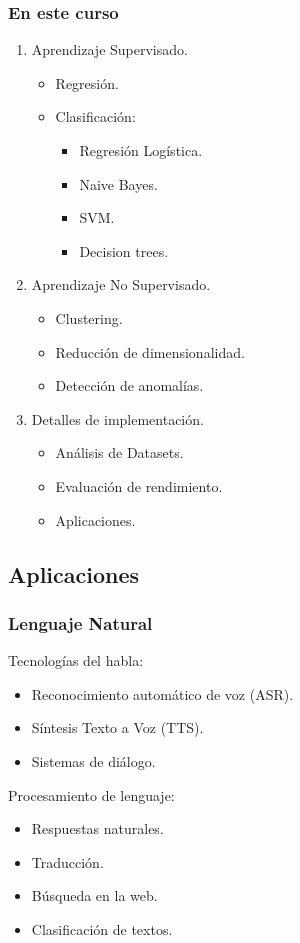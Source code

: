 \documentclass[10pt]{beamer}
\begin{document}
\begin{frame}
    \frametitle{En este curso}
    \begin{enumerate}
        \item Aprendizaje Supervisado.
            \begin{itemize}
                \item Regresión.
                \item Clasificación:
                    \begin{itemize}
                        \item Regresión Logística.
                        \item Naive Bayes.
                        \item SVM.
                        \item Decision trees.
                    \end{itemize}
            \end{itemize}
        \item Aprendizaje No Supervisado.
            \begin{itemize}
                \item Clustering.
                \item Reducción de dimensionalidad.
                \item Detección de anomalías.
            \end{itemize}
        \item Detalles de implementación.
            \begin{itemize}
                \item Análisis de Datasets.
                \item Evaluación de rendimiento.
                \item Aplicaciones.
            \end{itemize}
    \end{enumerate}
\end{frame}

\subsection{Aplicaciones}

\begin{frame}
    \frametitle{Lenguaje Natural}
    Tecnologías del habla:
    \begin{itemize}
        \item Reconocimiento automático de voz (ASR).
        \item Síntesis Texto a Voz (TTS).
        \item Sistemas de diálogo.
    \end{itemize}
    Procesamiento de lenguaje:
    \begin{itemize}
        \item Respuestas naturales.
        \item Traducción.
        \item Búsqueda en la web.
        \item Clasificación de textos.
    \end{itemize}
    
\end{frame}
\end{document}
